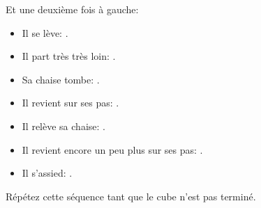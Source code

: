 Et une deuxième fois à gauche:


\begin{itemize}
	\item Il se lève: .
	\item Il part très très loin: .
	\item Sa chaise tombe: .
	\item Il revient sur ses pas: .
	\item Il relève sa chaise: .
	\item Il revient encore un peu plus sur ses pas: .	
	\item Il s'assied: .
\end{itemize}

Répétez cette séquence tant que le cube n'est pas terminé.
